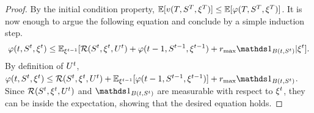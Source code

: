 \begin{proof}
By the initial condition property, $\mathbb{E}[v(T,S^T,\xi^T)] \leq \mathbb{E}[\varphi(T,S^T,\xi^T)]$.
It is now enough to argue the following equation and conclude by a simple induction step.
\[
\varphi(t,\St,\xit)\leq \E_{\xi^{t-1}}[\Re(\St,\xit,\Ut)+\varphi(t-1,S^{t-1},\xi^{t-1}) +  \rmax\Ins{B(t,\St)}|\xit].
\]
By definition of $U^t$, $\varphi(t,\St,\xit)\leq \Re(\St,\xit,\Ut)+\E_{\xi^{t-1}}[\varphi(t-1,S^{t-1},\xi^{t-1})] +  \rmax\Ins{B(t,\St)}$.
Since $\mathcal{R}(S^t,\xi^t,U^t)$ and $\Ins{B(t,\St)}$ are measurable with respect to $\xi^t$, they can be inside the expectation, showing that the desired equation holds.
\end{proof}

